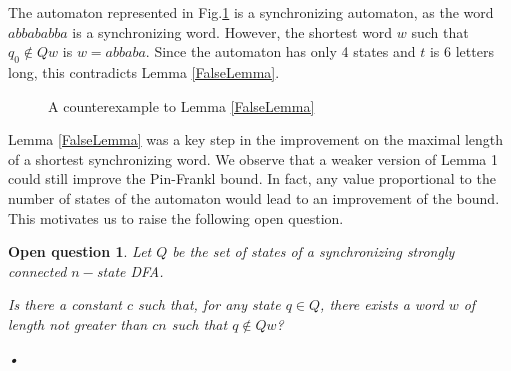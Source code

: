\documentclass{llncs}
\newenvironment{counterex}[1][Counterexample]{\begin{trivlist}
\item[\hskip \labelsep {\bfseries #1}]}{\end{trivlist}}
\newtheorem*{Openquest}{Open question}
\begin{document}
\begin{counterex}

The automaton represented in Fig.\ref{Counter} is a synchronizing automaton, as the word $abbababba$ is a synchronizing word. However, the shortest word $w$ such that $q_0 \notin Q w$ is $w=abbaba$. Since the automaton has only 4 states and $t$ is 6 letters long, this contradicts Lemma \ref{FalseLemma}.

\begin{figure}[h!]
\begin{center}
\end{center}
\caption{A counterexample to Lemma \ref{FalseLemma}}
\label{Counter}
\end{figure}

\end{counterex}

Lemma \ref{FalseLemma} was a key step in the improvement on the maximal length of a shortest synchronizing word. We observe that a weaker version of Lemma 1 could still improve the Pin-Frankl bound. In fact, any value proportional to the number of states of the automaton would lead to an improvement of the bound. This motivates us to raise the following open question.

\begin{Openquest}
Let $Q$ be the set of states of a synchronizing strongly connected $n-$state DFA.

Is there a constant $c$ such that, for any state $q\in Q$, there exists a word $w$ of length not greater than $cn$ such that $q \notin Q w$?
\end{Openquest}






\textit{•}
\end{document}

